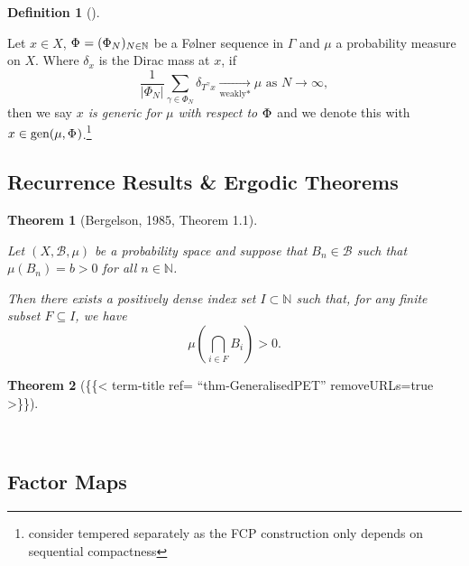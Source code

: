 \documentclass[
  british,
]{article}
\theoremstyle{definition}
\newtheorem{definition}{Definition}[section]
\theoremstyle{plain}
\theoremstyle{plain}
\newtheorem{theorem}{Theorem}[section]
\theoremstyle{plain}
\theoremstyle{remark}
\newcommand{\CountingMeasure}[1]{{\left|#1\right|}}
\newcommand{\Folner}[1][\vphantom{}]{{\Phi}_{#1}}
\newcommand{\GroupAction}[2]{T^{#1}{#2}}
\newcommand{\GroupElement}{{\gamma}}
\newcommand{\Measure}{{\mu}}
\newcommand{\SigmaAlgebra}[1]{{\mathscr{#1}}}
\begin{document}
\begin{definition}[]\protect\hypertarget{def-GenericDef}{}\label{def-GenericDef}

Let \(x\in X\), \(\Folner=(\Folner[N])_{N\in\mathbb{N}}\) be a Følner
sequence in \(\Gamma\) and \(\Measure\) a probability measure on \(X\).
Where \(\delta_x\) is the Dirac mass at \(x\), if
\[\frac{1}{\CountingMeasure{\Folner[N]}}\sum_{\GroupElement\in\Folner[N]}\delta_{\GroupAction{\GroupElement}{x}}\underset{\text{weakly*}}{\longrightarrow} \Measure \text{ as }N\rightarrow\infty, \]
then we say \emph{\(x\) is generic for \(\Measure\) with respect to
\(\Folner\)} and we denote this with
\(x\in\text{gen}(\Measure,\Folner)\).\footnote{consider tempered
  separately as the FCP construction only depends on sequential
  compactness}

\end{definition}

\subsection{Recurrence Results \& Ergodic
Theorems}\label{recurrence-results-ergodic-theorems}

\begin{theorem}[{Bergelson, 1985, Theorem
1.1}]\protect\hypertarget{thm-BergelsonRecurrence}{}\label{thm-BergelsonRecurrence}

Let \((X,\SigmaAlgebra{B},\Measure)\) be a probability space and suppose
that \(B_n\in\SigmaAlgebra{B}\) such that \(\Measure(B_n)=b>0\) for all
\(n\in\mathbb{N}\).

Then there exists a positively dense index set \(I\subset\mathbb{N}\)
such that, for any finite subset \(F\subseteq I\), we have
\[\Measure\left(\bigcap_{i\in F}B_i \right)>0. \]

\end{theorem}

\begin{theorem}[\{\{\textless{} term-title ref= ``thm-GeneralisedPET''
removeURLs=true
\textgreater\}\}]\protect\hypertarget{thm-GeneralisedPET}{}\label{thm-GeneralisedPET}

~

\end{theorem}

\subsection{Factor Maps}\label{factor-maps}
\end{document}
